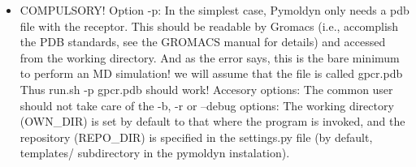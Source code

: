 \documentclass[10pt, oneside, pdftex]{article}
\begin{document}
\begin{itemize}
\item{COMPULSORY! Option  -p: In  the simplest case,  Pymoldyn only
  needs  a pdb  file with  the receptor.  This should  be  readable by
  Gromacs (i.e., accomplish the  PDB standards, see the GROMACS manual
  for details)  and accessed  from the working  directory. And  as the
  error says, this is the bare minimum to perform an MD simulation! we
  will assume that the file is called gpcr.pdb Thus run.sh -p gpcr.pdb
  should work!  Accesory options: The common user should not take care
  of the -b, -r or --debug options: The working directory (OWN\_DIR) is
  set  by  default to  that  where the  program  is  invoked, and  the
  repository  (REPO\_DIR)  is specified  in  the  settings.py file  (by
  default,  templates/  subdirectory   in  the  pymoldyn  instalation).}
  

\end{itemize}
\end{document}

